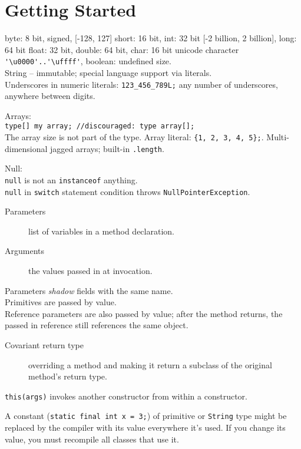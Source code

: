 \section{Getting Started}

byte: 8 bit, signed, [-128, 127]
short: 16 bit, int: 32 bit [-2 billion, 2 billion], long: 64 bit
float: 32 bit, double: 64 bit, char: 16 bit unicode character
\verb='\u0000'..'\uffff'=,
boolean: undefined size.\\
String – immutable; special language support via literals.\\
Underscores in numeric literals: \verb=123_456_789L;=
any number of underscores, anywhere between digits.

Arrays:\\
\verb=type[] my array; //discouraged: type array[];=\\
The array size is not part of the type.
Array literal: \verb={1, 2, 3, 4, 5};=.
Multi-dimensional jagged arrays; built-in \verb=.length=.

Null:\\
\verb=null= is not an \verb=instanceof= anything.\\
\verb=null= in \verb=switch= statement condition
throws \verb=NullPointerException=.

\begin{description}
\item[Parameters] list of variables in a method declaration.
\item[Arguments] the values passed in at invocation.
\end{description}

Parameters \emph{shadow} fields with the same name.\\
Primitives are passed by value.\\
Reference parameters are also passed by value; after the method returns,
the passed in reference still references the same object.

\begin{description}
\item[Covariant return type]
overriding a method and making it return a subclass
of the original method's return type.
\end{description}

\verb=this(args)= invokes another constructor from within a constructor.

A constant (\verb|static final int x = 3;|) of primitive or \verb=String= type
might be replaced by the compiler with its value everywhere it's used.
If you change its value, you must recompile all classes that use it.

